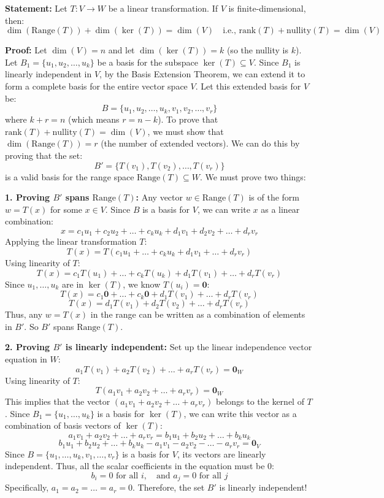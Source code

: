 \documentclass[11pt,a4paper]{article}
\begin{document}
\begin{solutionbox}
\textbf{Statement:} Let $T: V \to W$ be a linear transformation. If $V$ is finite-dimensional, then:
\[ \dim(\text{Range}(T)) + \dim(\ker(T)) = \dim(V) \quad \text{i.e., } \text{rank}(T) + \text{nullity}(T) = \dim(V) \]

\textbf{Proof:}
Let $\dim(V) = n$ and let $\dim(\ker(T)) = k$ (so the nullity is $k$).
Let $B_1 = \{u_1, u_2, \dots, u_k\}$ be a basis for the subspace $\ker(T) \subseteq V$.
Since $B_1$ is linearly independent in $V$, by the Basis Extension Theorem, we can extend it to form a complete basis for the entire vector space $V$.
Let this extended basis for $V$ be:
\[ B = \{u_1, u_2, \dots, u_k, v_1, v_2, \dots, v_r\} \]
where $k + r = n$ (which means $r = n - k$).
To prove that $\text{rank}(T) + \text{nullity}(T) = \dim(V)$, we must show that $\dim(\text{Range}(T)) = r$ (the number of extended vectors).
We can do this by proving that the set:
\[ B' = \{T(v_1), T(v_2), \dots, T(v_r)\} \]
is a valid basis for the range space $\text{Range}(T) \subseteq W$. We must prove two things:

\textbf{1. Proving $B'$ spans $\text{Range}(T)$:}
Any vector $w \in \text{Range}(T)$ is of the form $w = T(x)$ for some $x \in V$.
Since $B$ is a basis for $V$, we can write $x$ as a linear combination:
\[ x = c_1 u_1 + c_2 u_2 + \dots + c_k u_k + d_1 v_1 + d_2 v_2 + \dots + d_r v_r \]
Applying the linear transformation $T$:
\[ T(x) = T(c_1 u_1 + \dots + c_k u_k + d_1 v_1 + \dots + d_r v_r) \]
Using linearity of $T$:
\[ T(x) = c_1 T(u_1) + \dots + c_k T(u_k) + d_1 T(v_1) + \dots + d_r T(v_r) \]
Since $u_1, \dots, u_k$ are in $\ker(T)$, we know $T(u_i) = \mathbf{0}$:
\[ T(x) = c_1 \mathbf{0} + \dots + c_k \mathbf{0} + d_1 T(v_1) + \dots + d_r T(v_r) \]
\[ T(x) = d_1 T(v_1) + d_2 T(v_2) + \dots + d_r T(v_r) \]
Thus, any $w = T(x)$ in the range can be written as a combination of elements in $B'$. So $B'$ spans $\text{Range}(T)$.

\textbf{2. Proving $B'$ is linearly independent:}
Set up the linear independence vector equation in $W$:
\[ a_1 T(v_1) + a_2 T(v_2) + \dots + a_r T(v_r) = \mathbf{0}_W \]
Using linearity of $T$:
\[ T(a_1 v_1 + a_2 v_2 + \dots + a_r v_r) = \mathbf{0}_W \]
This implies that the vector $(a_1 v_1 + a_2 v_2 + \dots + a_r v_r)$ belongs to the kernel of $T$.
Since $B_1 = \{u_1, \dots, u_k\}$ is a basis for $\ker(T)$, we can write this vector as a combination of basis vectors of $\ker(T)$:
\[ a_1 v_1 + a_2 v_2 + \dots + a_r v_r = b_1 u_1 + b_2 u_2 + \dots + b_k u_k \]
\[ b_1 u_1 + b_2 u_2 + \dots + b_k u_k - a_1 v_1 - a_2 v_2 - \dots - a_r v_r = \mathbf{0}_V \]
Since $B = \{u_1, \dots, u_k, v_1, \dots, v_r\}$ is a basis for $V$, its vectors are linearly independent. Thus, all the scalar coefficients in the equation must be 0:
\[ b_i = 0 \text{ for all } i, \quad \text{and } a_j = 0 \text{ for all } j \]
Specifically, $a_1 = a_2 = \dots = a_r = 0$.
Therefore, the set $B'$ is linearly independent!


\end{solutionbox}
\end{document}
